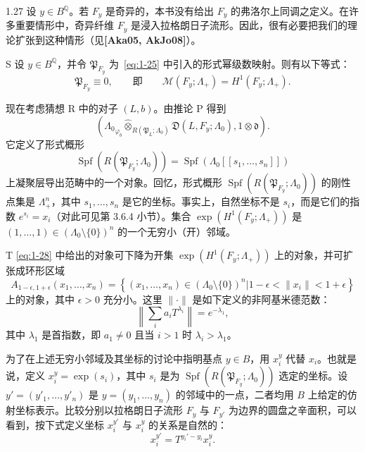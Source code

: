 \begin{remark}{1.27}\label{rem:1-27}
设 $y\in B^{\mathbb Q}$。若 $F_y$ 是奇异的，本书没有给出 $F_y$ 的弗洛尔上同调之定义。在许多重要情形中，奇异纤维 $F_y$ 是浸入拉格朗日子流形。因此，很有必要把我们的理论扩张到这种情形（见\textbf{[Aka05, AkJo08]}）。
\end{remark}

\begin{conjecture}{S}\label{conj:intro-S}
设 $y\in B^{\mathbb Q}$，并令 $\mathfrak P_{F_y}$ 为~\eqref{eq:1-25} 中引入的形式幂级数映射。则有以下等式：
\[
  \mathfrak P_{F_y}\equiv0,
  \qquad\text{即}\qquad
  \mathcal M(F_y;\Lambda_+)=H^1(F_y;\Lambda_+).
\]
\end{conjecture}

现在考虑猜想 R 中的对子 $(L,b)$。由推论 P 得到
\begin{equation}
  \left(
    {\Lambda_0}_{\varphi_b}
    \mathbin{\widehat\otimes}_{R(\mathfrak P_L;\Lambda_0)}
    \mathfrak D(L,F_y;\Lambda_0),
    1\otimes\mathfrak d
  \right).
  \tag{1.28}\label{eq:1-28}
\end{equation}
它定义了形式概形
\[
  \operatorname{Spf}(R(\mathfrak P_{F_y};\Lambda_0))
  =\operatorname{Spf}(\Lambda_0[[s_1,\ldots,s_n]])
\]
上凝聚层导出范畴中的一个对象。回忆，形式概形
$\operatorname{Spf}(R(\mathfrak P_{F_y};\Lambda_0))$ 的刚性点集是
$\Lambda_+^n$，其中 $s_1,\ldots,s_n$ 是它的坐标。事实上，自然坐标不是 $s_i$，而是它们的指数
$e^{s_i}=x_i$（对此可见第 3.6.4 小节）。集合
$\exp(H^1(F_y;\Lambda_+))$ 是
$(1,\ldots,1)\in(\Lambda_0\setminus\{0\})^n$ 的一个无穷小（开）邻域。

\begin{conjecture}{T}\label{conj:intro-T}
\eqref{eq:1-28} 中给出的对象可下降为开集
$\exp(H^1(F_y;\Lambda_+))$ 上的对象，并可扩张成环形区域
\[
  A_{1-\epsilon,1+\epsilon}(x_1,\ldots,x_n)
  =\left\{(x_1,\ldots,x_n)\in(\Lambda_0\setminus\{0\})^n
  \mathrel{\Big|}1-\epsilon<\lVert x_i\rVert<1+\epsilon\right\}
\]
上的对象，其中 $\epsilon>0$ 充分小。这里 $\lVert\mathord\cdot\rVert$ 是如下定义的非阿基米德范数：
\[
  \left\lVert\sum_i a_iT^{\lambda_i}\right\rVert=e^{-\lambda_1},
\]
其中 $\lambda_1$ 是首指数，即 $a_1\ne0$ 且当 $i>1$ 时 $\lambda_i>\lambda_1$。
\end{conjecture}

为了在上述无穷小邻域及其坐标的讨论中指明基点 $y\in B$，用 $x_i^y$ 代替 $x_i$。也就是说，定义 $x_i^y=\exp(s_i)$，其中 $s_i$ 是为
$\operatorname{Spf}(R(\mathfrak P_{F_y};\Lambda_0))$ 选定的坐标。设
$y'=(y'_1,\ldots,y'_n)$ 是 $y=(y_1,\ldots,y_n)$ 的邻域中的一点，二者均用 $B$ 上给定的仿射坐标表示。比较分别以拉格朗日子流形 $F_y$ 与 $F_{y'}$ 为边界的圆盘之辛面积，可以看到，按下式定义坐标 $x_i^{y'}$ 与 $x_i^y$ 的关系是自然的：
\begin{equation}
  x_i^{y'}=T^{y_i'-y_i}x_i^y.
  \tag{1.29}\label{eq:1-29}
\end{equation}

